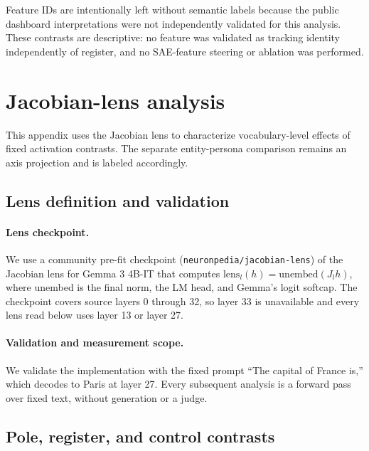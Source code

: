 Feature IDs are intentionally left without semantic labels because the public
dashboard interpretations were not independently validated for this analysis.
These contrasts are descriptive: no feature was validated as tracking identity
independently of register, and no SAE-feature steering or ablation was
performed.

\FloatBarrier

\section{Jacobian-lens analysis}
\label{app:jlens}

This appendix uses the Jacobian lens to characterize vocabulary-level effects
of fixed activation contrasts. The separate entity-persona comparison remains
an axis projection and is labeled accordingly.

\subsection{Lens definition and validation}

\paragraph{Lens checkpoint.}
We use a community pre-fit checkpoint
(\texttt{neuronpedia/jacobian-lens}) \citep{neuronpedia2026jlens} of the
Jacobian lens \citep{gurnee2026workspace} for Gemma 3 4B-IT that computes
$\mathrm{lens}_l(h) = \mathrm{unembed}(J_l h)$, where unembed is the final norm,
the LM head, and Gemma's logit softcap. The checkpoint covers source layers 0
through 32, so layer 33 is unavailable and every lens read below uses layer 13
or layer 27.

\paragraph{Validation and measurement scope.}
We validate the implementation with the fixed prompt ``The capital of
France is,'' which decodes to Paris at layer 27. Every subsequent analysis is a
forward pass over fixed text, without generation or a judge.

\subsection{Pole, register, and control contrasts}

